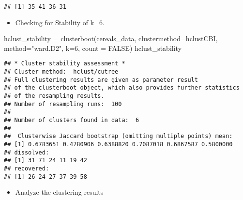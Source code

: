 \documentclass[
]{article}
\newenvironment{Shaded}{\begin{snugshade}}{\end{snugshade}}
\newcommand{\AttributeTok}[1]{\textcolor[rgb]{0.77,0.63,0.00}{#1}}
\newcommand{\CommentTok}[1]{\textcolor[rgb]{0.56,0.35,0.01}{\textit{#1}}}
\newcommand{\ConstantTok}[1]{\textcolor[rgb]{0.00,0.00,0.00}{#1}}
\newcommand{\DecValTok}[1]{\textcolor[rgb]{0.00,0.00,0.81}{#1}}
\newcommand{\FunctionTok}[1]{\textcolor[rgb]{0.00,0.00,0.00}{#1}}
\newcommand{\NormalTok}[1]{#1}
\newcommand{\OtherTok}[1]{\textcolor[rgb]{0.56,0.35,0.01}{#1}}
\newcommand{\SpecialCharTok}[1]{\textcolor[rgb]{0.00,0.00,0.00}{#1}}
\newcommand{\StringTok}[1]{\textcolor[rgb]{0.31,0.60,0.02}{#1}}
\providecommand{\tightlist}{%
  \setlength{\itemsep}{0pt}\setlength{\parskip}{0pt}}
\begin{document}
\begin{Shaded}
\end{Shaded}

\begin{verbatim}
## [1] 35 41 36 31
\end{verbatim}

\begin{itemize}
\tightlist
\item
  Checking for Stability of k=6.
\end{itemize}

\begin{Shaded}
\begin{Highlighting}[]
\NormalTok{hclust\_stability }\OtherTok{=} \FunctionTok{clusterboot}\NormalTok{(cereals\_data, }\AttributeTok{clustermethod=}\NormalTok{hclustCBI, }\AttributeTok{method=}\StringTok{"ward.D2"}\NormalTok{, }\AttributeTok{k=}\DecValTok{6}\NormalTok{, }\AttributeTok{count =} \ConstantTok{FALSE}\NormalTok{)}
\NormalTok{hclust\_stability}
\end{Highlighting}
\end{Shaded}

\begin{verbatim}
## * Cluster stability assessment *
## Cluster method:  hclust/cutree 
## Full clustering results are given as parameter result
## of the clusterboot object, which also provides further statistics
## of the resampling results.
## Number of resampling runs:  100 
## 
## Number of clusters found in data:  6 
## 
##  Clusterwise Jaccard bootstrap (omitting multiple points) mean:
## [1] 0.6783651 0.4780906 0.6388820 0.7087018 0.6867587 0.5800000
## dissolved:
## [1] 31 71 24 11 19 42
## recovered:
## [1] 26 24 27 37 39 58
\end{verbatim}

\begin{itemize}
\tightlist
\item
  Analyze the clustering results
\end{itemize}

\begin{Shaded}
\end{Shaded}
\end{document}
